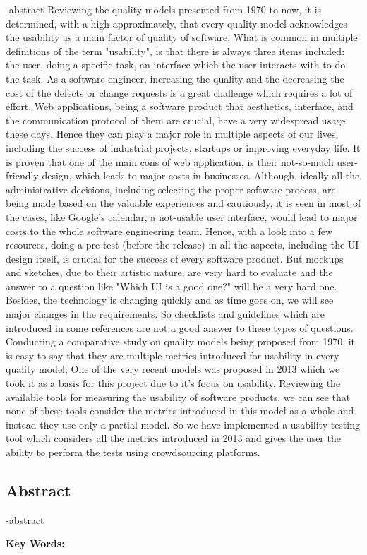 
\en-abstract{
Reviewing the quality models presented from 1970 to now, it is determined, with a high approximately, that every quality model acknowledges the usability as a main factor of quality of software. What is common in multiple definitions of the term "usability", is that there is always three items included: the user, doing a specific task, an interface which the user interacts with to do the task. As a software engineer, increasing the quality and the decreasing the cost of the defects or change requests is a great challenge which requires a lot of effort. Web applications, being a software product that aesthetics, interface, and the communication protocol of them are crucial, have a very widespread usage these days. Hence they can play a major role in multiple aspects of our lives, including the success of industrial projects, startups or improving everyday life. It is proven that one of the main cons of web application, is their not-so-much user-friendly design, which leads to major costs in businesses. Although, ideally all the administrative decisions, including selecting the proper software process, are being made based on the valuable experiences and cautiously, it is seen in most of the cases, like Google's calendar, a not-usable user interface, would lead to major costs to the whole software engineering team. Hence, with a look into a few resources, doing a pre-test (before the release) in all the aspects, including the UI design itself, is crucial for the success of every software product. But mockups and sketches, due to their artistic nature, are very hard to evaluate and the answer to a question like "Which UI is a good one?" will be a very hard one. Besides, the technology is changing quickly and as time goes on, we will see major changes in the requirements. So checklists and guidelines which are introduced in some references are not a good answer to these types of questions. Conducting a comparative study on quality models being proposed from 1970, it is easy to say that they are multiple metrics introduced for usability in every quality model; One of the very recent models was proposed in 2013 which we took it as a basis for this project due to it's focus on usability. Reviewing the available tools for measuring the usability of software products, we can see that none of these tools consider the metrics introduced in this model as a whole and instead they use only a partial model. So we have implemented a usability testing tool which considers all the metrics introduced in 2013 and gives the user the ability to perform the tests using crowdsourcing platforms.
}

\newpage
\thispagestyle{empty}
\begin{latin}
\section*{\LARGE\centering Abstract}
\een-abstract

\vspace*{.5cm}
{\large\textbf{Key Words:}}\par
\vspace*{.5cm}
\elatinkeywords
\end{latin}